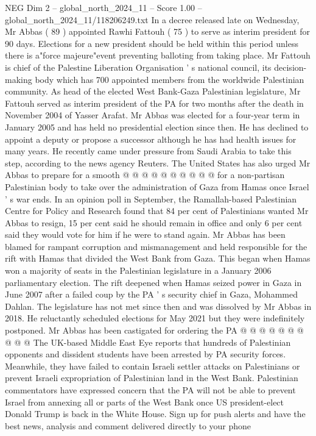 \begin{textsample}{NEG Dim 2 – global\_north\_2024\_11 – Score 1.00 – global\_north\_2024\_11/118206249.txt}  \label{ex:f2_neg_192}
In a decree released late on Wednesday, Mr Abbas ( 89 ) appointed Rawhi Fattouh ( 75 ) to serve as interim president for 90 days.
Elections for a new president should be held within this period unless there is a"force majeure"event preventing balloting from taking place.
Mr Fattouh is chief of the Palestine Liberation Organisation ' s national council, its decision-making body which has 700 appointed members from the worldwide Palestinian community.
As head of the elected West Bank-Gaza Palestinian legislature, Mr Fattouh served as interim president of the PA for two months after the death in November 2004 of Yasser Arafat.
Mr Abbas was elected for a four-year term in January 2005 and has held no presidential election since then.
He has declined to appoint a deputy or propose a successor although he has had health issues for many years.
He recently came under pressure from Saudi Arabia to take this step, according to the news agency Reuters.
The United States has also urged Mr Abbas to prepare for a smooth @ @ @ @ @ @ @ @ @ @ for a non-partisan Palestinian body to take over the administration of Gaza from Hamas once Israel ' s war ends.
In an opinion poll in September, the Ramallah-based Palestinian Centre for Policy and Research found that 84 per cent of Palestinians wanted Mr Abbas to resign, 15 per cent said he should remain in office and only 6 per cent said they would vote for him if he were to stand again.
Mr Abbas has been blamed for rampant corruption and mismanagement and held responsible for the rift with Hamas that divided the West Bank from Gaza.
This began when Hamas won a majority of seats in the Palestinian legislature in a January 2006 parliamentary election.
The rift deepened when Hamas seized power in Gaza in June 2007 after a failed coup by the PA ' s security chief in Gaza, Mohammed Dahlan.
The legislature has not met since then and was dissolved by Mr Abbas in 2018.
He reluctantly scheduled elections for May 2021 but they were indefinitely postponed.
Mr Abbas has been castigated for ordering the PA @ @ @ @ @ @ @ @ @ @ The UK-based Middle East Eye reports that hundreds of Palestinian opponents and dissident students have been arrested by PA security forces.
Meanwhile, they have failed to contain Israeli settler attacks on Palestinians or prevent Israeli expropriation of Palestinian land in the West Bank.
Palestinian commentators have expressed concern that the PA will not be able to prevent Israel from annexing all or parts of the West Bank once US president-elect Donald Trump is back in the White House.
Sign up for push alerts and have the best news, analysis and comment delivered directly to your phone

\end{textsample}
